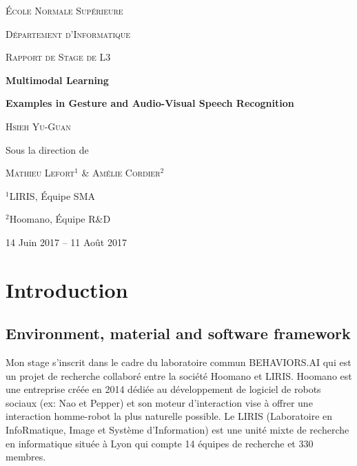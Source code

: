 

\begin{titlepage}

  \centering

  \vspace*{1.5em}
  {\LARGE \scshape École Normale Supérieure \par}
  {\Large \scshape Département d'Informatique \par}

  {\Large \scshape Rapport de Stage de L3 \par}

  \vspace{14em}
  {\huge \bfseries Multimodal Learning \par} 
  {\Large \bfseries
    Examples in Gesture and Audio-Visual Speech Recognition \par}

  \vspace{4em}
  {\Large \scshape Hsieh Yu-Guan \par}
  
  \vspace{2em}
  {\Large Sous la direction de \par}

  \vspace{0.5em}
  {\Large \scshape Mathieu Lefort$^1$ \& Amélie Cordier$^2$ \par}

  \vspace{0.5em}
  {\large $^1$LIRIS, Équipe SMA \par}
  {\large $^2$Hoomano, Équipe R\&D \par}

  \vspace{8em}
  {\Large 14 Juin 2017 -- 11 Août 2017}

  \vfill

\end{titlepage}

\section{Introduction} \label{section:introduction}

\subsection{Environment, material and software framework}

Mon stage s'inscrit dans le cadre du laboratoire commun BEHAVIORS.AI
qui est un projet de recherche collaboré entre la société Hoomano et LIRIS.
Hoomano est une entreprise créée en 2014 dédiée au développement de
logiciel de robots sociaux (ex: Nao et Pepper) et son moteur d'interaction
vise à offrer une interaction homme-robot la plus naturelle possible.
Le LIRIS (Laboratoire en InfoRmatique, Image et Système d'Information)
est une unité mixte de recherche en informatique située à Lyon qui compte
14 équipes de recherche et 330 membres.

